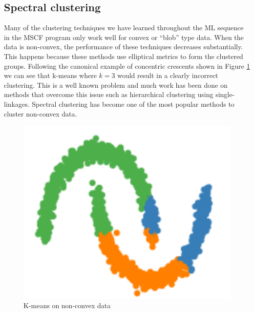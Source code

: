 \documentclass[a4paper]{article}
\begin{document}
\begin{multicols}{2}
\section{Spectral clustering}\label{spectral}
Many of the clustering techniques we have learned throughout the ML sequence in the MSCF program only work well for convex or ``blob'' type data. When the data is non-convex, the performance of these techniques decreases substantially. This happens because these methods use elliptical metrics to form the clustered groups. Following the canonical example of concentric crescents shown in Figure \ref{fig:nonconvex} we can see that k-means where $k=3$ would result in a clearly incorrect clustering. This is a well known problem and much work has been done on methods that overcome this issue such as hierarchical clustering using single-linkages. Spectral clustering has become one of the most popular methods to cluster non-convex data.
\begin{figure}[H]
\centering
    \includegraphics[totalheight=3cm]{nonconvex_sets.png}
    \caption{K-means on non-convex data}
    \label{fig:nonconvex}
\end{figure}

\end{multicols}
\end{document}
